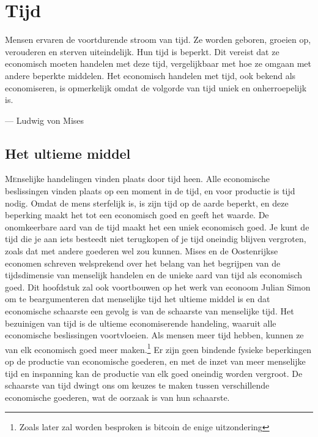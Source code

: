 \chapter{Tijd}

\begin{blockquotebox}
    Mensen ervaren de voortdurende stroom van tijd. Ze worden geboren, groeien op, verouderen en sterven uiteindelijk. Hun tijd is beperkt. Dit vereist dat ze economisch moeten handelen met deze tijd, vergelijkbaar met hoe ze omgaan met andere beperkte middelen. Het economisch handelen met tijd, ook bekend als economiseren, is opmerkelijk omdat de volgorde van tijd uniek en onherroepelijk is.\footnotemark
    \par\raggedleft--- Ludwig von Mises
\end{blockquotebox}

\section{Het ultieme middel}

\lettrine{M}enselijke handelingen vinden plaats door tijd heen. Alle economische beslissingen vinden plaats op een moment in de tijd, en voor productie is tijd nodig. Omdat de mens sterfelijk is, is zijn tijd op de aarde beperkt, en deze beperking maakt het tot een economisch goed en geeft het waarde. De onomkeerbare aard van de tijd maakt het een uniek economisch goed. Je kunt de tijd die je aan iets besteedt niet terugkopen of je tijd oneindig blijven vergroten, zoals dat met andere goederen wel zou kunnen. Mises en de Oostenrijkse economen schreven welsprekend over het belang van het begrijpen van de tijdsdimensie van menselijk handelen en de unieke aard van tijd als economisch goed. Dit hoofdstuk zal ook voortbouwen op het werk van econoom Julian Simon om te beargumenteren dat menselijke tijd het ultieme middel is en dat economische schaarste een gevolg is van de schaarste van menselijke tijd. Het bezuinigen van tijd is de ultieme economiserende handeling, waaruit alle economische beslissingen voortvloeien. Als mensen meer tijd hebben, kunnen ze van elk economisch goed meer maken.\footnote{Zoals later zal worden besproken is bitcoin de enige uitzondering} Er zijn geen bindende fysieke beperkingen op de productie van economische goederen, en met de inzet van meer menselijke tijd en inspanning kan de productie van elk goed oneindig worden vergroot. De schaarste van tijd dwingt ons om keuzes te maken tussen verschillende economische goederen, wat de oorzaak is van hun schaarste.

